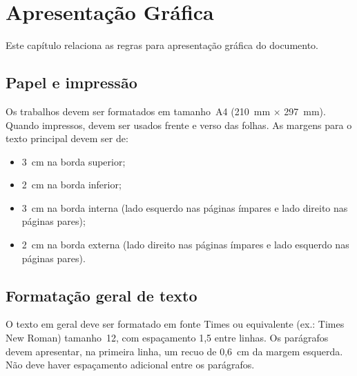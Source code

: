 \documentclass{ifsultcc}
\begin{document}
%

\tableofcontents

\chapter{Apresentação Gráfica}
Este capítulo relaciona as regras para apresentação gráfica do documento.

\section{Papel e impressão}
Os trabalhos devem ser formatados em tamanho~A4 (210~mm $\times$ 297~mm).  Quando impressos, devem ser usados frente e verso das folhas.  As margens para o texto principal devem ser de:
\begin{itemize}
	\item 3~cm na borda superior;
	\item 2~cm na borda inferior;
	\item 3~cm na borda interna (lado esquerdo nas páginas ímpares e lado direito nas páginas pares);
	\item 2~cm na borda externa (lado direito nas páginas ímpares e lado esquerdo nas páginas pares).
\end{itemize}
  
\section{Formatação geral de texto}
O texto em geral deve ser formatado em fonte Times ou equivalente (ex.: Times New Roman) tamanho~12, com espaçamento 1,5 entre linhas.  Os parágrafos devem apresentar, na primeira linha, um recuo de 0,6~cm da margem esquerda.  Não deve haver espaçamento adicional entre os parágrafos.
\end{document}
